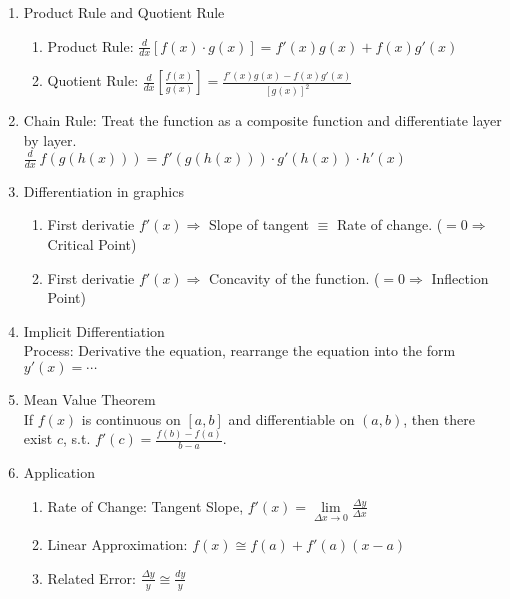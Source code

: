 \documentclass[12px]{article}
\begin{document}
\begin{enumerate}
\begin{enumerate}[(1)]
\begin{multicols}{3}
\begin{enumerate}
                \item $\frac{d}{dx}\ (cosx)=-sinx$
                \item $\frac{d}{dx}\ (tanx)=sec^2x$
                \item $\frac{d}{dx}\ (secx)=secx\cdot tanx$
            \end{enumerate}
        \end{multicols}
        \item Product Rule and Quotient Rule
        \begin{enumerate}
            \item Product Rule: $\frac{d}{dx}[f(x)\cdot g(x)]=f'(x)g(x)+f(x)g'(x)$
            \item Quotient Rule: $\frac{d}{dx}[\frac{f(x)}{g(x)}]=\frac{f'(x)g(x)-f(x)g'(x)}{[g(x)]^2}$
        \end{enumerate}
        \item Chain Rule: Treat the function as a composite function and differentiate layer by layer.\\
        $\frac{d}{dx}\ f(g(h(x)))=f'(g(h(x)))\cdot g'(h(x))\cdot h'(x)$
        \item Differentiation in graphics
        \begin{enumerate}
            \item First derivatie $f'(x)\Rightarrow$ Slope of tangent $\equiv$ Rate of change. ($=0\Rightarrow$ Critical Point)
            \item First derivatie $f'(x)\Rightarrow$ Concavity of the function. ($=0\Rightarrow$ Inflection Point)
        \end{enumerate}
        \newpage
        \item Implicit Differentiation\\
        Process: Derivative the equation, rearrange the equation into the form $y'(x)=\cdots$
        \item Mean Value Theorem\\
        If $f(x)$ is continuous on $[a,b]$ and differentiable on $(a,b)$, then there exist $c$, s.t. $f'(c)=\frac{f(b)-f(a)}{b-a}$. 
        \item Application
        \begin{enumerate}
            \item Rate of Change: Tangent Slope, $f'(x)=\lim\limits_{\Delta x\to 0}\frac{\Delta y}{\Delta x}$
            \item Linear Approximation: $f(x)\cong f(a)+f'(a)(x-a)$
            \item Related Error: $\frac{\Delta y}{y}\cong \frac{dy}{y}$

\end{enumerate}
\end{enumerate}
\end{enumerate}
\end{document}
